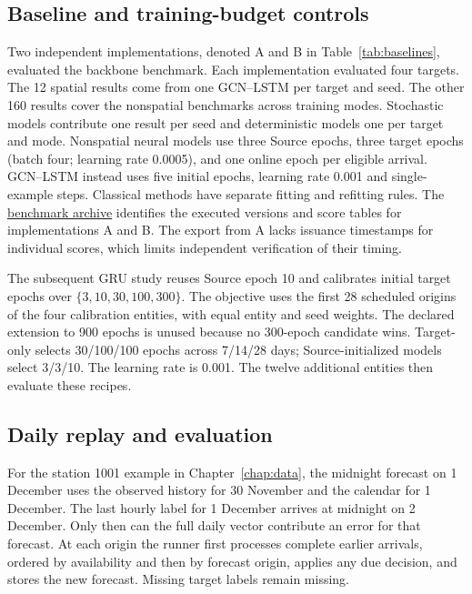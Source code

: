 \subsection{Baseline and training-budget controls}
Two independent implementations, denoted A and B in Table~\ref{tab:baselines}, evaluated the backbone benchmark. Each implementation evaluated four targets. The 12 spatial results come from one GCN--LSTM per target and seed. The other 160 results cover the nonspatial benchmarks across training modes. Stochastic models contribute one result per seed and deterministic models one per target and mode. Nonspatial neural models use three Source epochs, three target epochs (batch four; learning rate 0.0005), and one online epoch per eligible arrival. GCN--LSTM instead uses five initial epochs, learning rate 0.001 and single-example steps. Classical methods have separate fitting and refitting rules. The \href{https://github.com/HungLD9505/adaptive-retention-ev/tree/52a91d3/docs/reports/issue99-teacher-review-20261111}{benchmark archive} identifies the executed versions and score tables for implementations A and B. The export from A lacks issuance timestamps for individual scores, which limits independent verification of their timing.

The subsequent GRU study reuses Source epoch 10 and calibrates initial target epochs over $\{3,10,30,100,300\}$. The objective uses the first 28 scheduled origins of the four calibration entities, with equal entity and seed weights. The declared extension to 900 epochs is unused because no 300-epoch candidate wins. Target-only selects 30/100/100 epochs across 7/14/28 days; Source-initialized models select 3/3/10. The learning rate is 0.001. The twelve additional entities then evaluate these recipes.

\subsection{Daily replay and evaluation}
For the station 1001 example in Chapter~\ref{chap:data}, the midnight forecast on 1 December uses the observed history for 30 November and the calendar for 1 December. The last hourly label for 1 December arrives at midnight on 2 December. Only then can the full daily vector contribute an error for that forecast. At each origin the runner first processes complete earlier arrivals, ordered by availability and then by forecast origin, applies any due decision, and stores the new forecast. Missing target labels remain missing.

